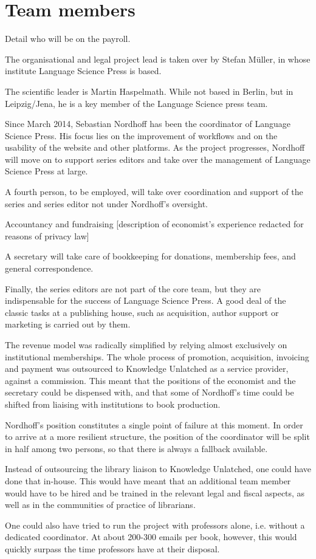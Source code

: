 \documentclass[nonflat,smallfont
]{langsci/langscibook}
\newcommand{\background}[1]{ 
  \vspace{5mm}
  \renewcommand{\tblslinecolour}{lsDarkBlue}
  \tblssy[red]{explore2}{Background}{\vspace*{-5mm}#1}
}
\newcommand{\langscisolution}[1]{
  \renewcommand{\tblslinecolour}{lsLightBlue}
  \tblssy{langsci}{LangSci solution}{\vspace*{-5mm}#1}
}
\newcommand{\evaluation}[1]{
  \renewcommand{\tblslinecolour}{lsLightOrange}
  \tblssy{receipt}{Evaluation}{\vspace*{-5mm}#1}
}
\newcommand{\othersolutions}[1]{
  \renewcommand{\tblslinecolour}{lsDarkGreenOne}
  \tblssy{more}{Other solutions}{\vspace*{-5mm}#1}
}
\renewcommand{\tblssy}[4][black!12]{%
  \renewcommand{\langscisymbol}{#2}\renewcommand{\tblsboxcolor}{#1}
  \begin{mdframed}[style=yellowexercise,frametitle={#3}]
    #4
  \end{mdframed}
}
\begin{document}
\section{Team members}

\background{Detail who will be on the payroll. }
\langscisolution{
The organisational and legal project lead is taken over by Stefan Müller, in whose institute Language Science Press is based.

The scientific leader is Martin Haspelmath. While not based in Berlin, but in Leipzig/Jena, he is a key member of the Language Science press team.

Since March 2014, Sebastian Nordhoff has been the coordinator of Language Science Press. His focus lies on the improvement of workflows and on the usability of the website and other platforms. As the project progresses, Nordhoff will move on to support series editors and take over the management of Language Science Press at large.

A fourth person, to be employed, will take over coordination and support of the series and series editor not under Nordhoff's oversight. 

Accountancy and fundraising
[description of economist's experience redacted for reasons of  privacy law]

A secretary will take care of bookkeeping for donations, membership fees, and general correspondence.

Finally, the series editors are not part of the core team, but they are indispensable for the success of Language Science Press. A good deal of the classic tasks at a publishing house, such as acquisition, author support or marketing is carried out by them. 

}
\evaluation{The revenue model was radically simplified by relying almost exclusively on institutional memberships. The whole process of promotion, acquisition, invoicing and payment was outsourced to Knowledge Unlatched as a service provider, against a commission. This meant that the positions of the economist and the secretary could be dispensed with, and that some of Nordhoff's time could be shifted from liaising with institutions to book production. 

Nordhoff's position constitutes a single point of failure at this moment. In order to arrive at a more resilient structure, the position of the coordinator will be split in half among two persons, so that there is always a fallback available.
}
\othersolutions{
Instead of outsourcing the library liaison to Knowledge Unlatched, one could have done that in-house. This would have meant that an additional team member would have to be hired and be trained in the relevant legal and fiscal aspects, as well as in the communities of practice of librarians. 

One could also have tried to run the project with professors alone, i.e. without a dedicated coordinator. At about 200-300 emails per book, however, this would quickly surpass the time professors have at their disposal. 
}
 
\end{document}

